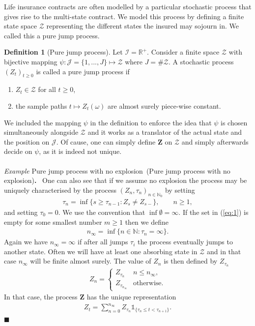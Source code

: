 \documentclass[12pt,letter,twoside]{article}
\theoremstyle{plain}
\theoremstyle{definition}
\newtheorem{definition}[theorem]{Definition}
\theoremstyle{remark}
\newcounter{example}
\newenvironment{example}[1][]
    {\refstepcounter{example}\def\temp{#1}
    \\\\\vspace{5pt}\textit{Example \theexample}\ifx\temp\empty\else\ (#1)\fi\textbf{.}\ }
    {\hfill$\blacksquare$\vspace{5pt}\\}
\begin{document}
Life insurance contracts are often modelled by a particular stochastic process that gives rise to the multi-state contract. We model this process by defining a finite state space $\mathcal Z$ representing the different states the insured may sojourn in. We called this a pure jump process.
\begin{definition}[Pure jump process]
Let $\mathcal I = \mathbb R^+$. Consider a finite space $\mathcal Z$ with bijective mapping $\psi : \mathcal J=\{1,...,J\}\mapsto \mathcal Z$ where $J=\#\mathcal Z$. A stochastic process $(Z_t)_{t\ge 0}$ is called a pure jump process if
\begin{enumerate}
    \item $Z_t\in \mathcal Z$ for all $t\ge 0$,
    \item the sample paths $t\mapsto Z_t(\omega)$ are almost surely piece-wise constant.
\end{enumerate}
\end{definition}
We included the mapping $\psi$ in the definition to enforce the idea that $\psi$ is chosen simultaneously alongside $\mathcal Z$ and it works as a translator of the actual state and the position on $\mathcal J$. Of cause, one can simply define $\mathbf Z$ on $\mathcal Z$ and simply afterwards decide on $\psi$, as it is indeed not unique.
\begin{example}[Pure jump process with no explosion]
One can also see that if we assume no explosion the process may be uniquely characterised by the process $(Z_n,\tau_n)_{n\in \mathbb N_0}$ by setting
\begin{align}\label{eq:1}
    \tau_n=\inf\{s\ge \tau_{n-1} : Z_s\ne Z_{s-}\},\qquad n\ge 1,
\end{align}
and setting $\tau_0=0$. We use the convention that $\inf \emptyset =\infty$. If the set in (\ref{eq:1}) is empty for some smallest number $m\ge 1$ then we define
\begin{align}
    n_\infty =\inf \{ n\in\mathbb N : \tau_n = \infty\}.
\end{align}
Again we have $n_\infty=\infty$ if after all jumps $\tau_i$ the process eventually jumps to another state. Often we will have at least one absorbing state in $\mathcal Z$ and in that case $n_\infty$ will be finite almost surely. The value of $Z_n$ is then defined by $Z_{\tau_n}$
\begin{align}
    Z_n=\begin{cases}
        Z_{\tau_n} & n\le n_\infty, \\
        Z_{\tau_{n_\infty}} & \text{otherwise}.
    \end{cases}
\end{align}
In that case, the process $\mathbf Z$ has the unique representation
\begin{align}\label{eq:2}
    Z_t=\sum_{n=0}^{n_\infty}Z_{\tau_n}\mathds 1_{\{\tau_n \le t< \tau_{n+1}\}}.
\end{align}
\end{example}
\end{document}
